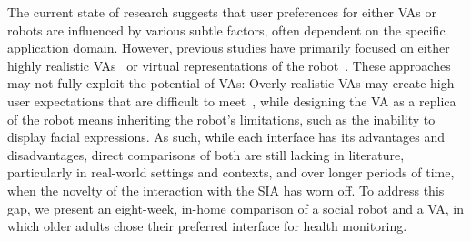 The current state of research suggests that user preferences for either \acp{VA} or robots are influenced by various subtle factors, often dependent on the specific application domain. 
However, previous studies have primarily focused on either highly realistic \acp{VA}~\cite{esposito2022} or virtual representations of the robot~\cite{nishio2021}. 
These approaches may not fully exploit the potential of \acp{VA}: 
Overly realistic \acp{VA} may create high user expectations that are difficult to meet~\cite{benmimoun2012}, while designing the \ac{VA} as a replica of the robot means inheriting the robot's limitations, such as the inability to display facial expressions.
As such, while each interface has its advantages and disadvantages, direct comparisons of both are still lacking in literature, particularly in real-world settings and contexts, and over longer periods of time, when the novelty of the interaction with the \ac{SIA} has worn off. 
To address this gap, we present an eight-week, in-home comparison of a social robot and a \ac{VA}, in which older adults chose their preferred interface for health monitoring.
%